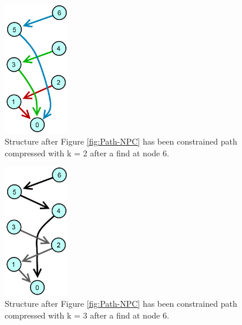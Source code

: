 \documentclass[11pt]{article}
\begin{document}
\begin{figure}[h]
\centering
\includegraphics[width=0.25\textwidth]{ContstrainedPathCompression-k2}
\caption{Structure after Figure \ref{fig:Path-NPC} has been constrained path compressed with k = 2 after a find at node 6.}
\label{fig:Path-CPC-k2}
\end{figure}

\begin{figure}[h]
\centering
\includegraphics[width=0.25\textwidth]{ContstrainedPathCompression-k3}
\caption{Structure after Figure \ref{fig:Path-NPC} has been constrained path compressed with k = 3 after a find at node 6.}
\label{fig:Path-CPC-k3}
\end{figure}
\end{document}
